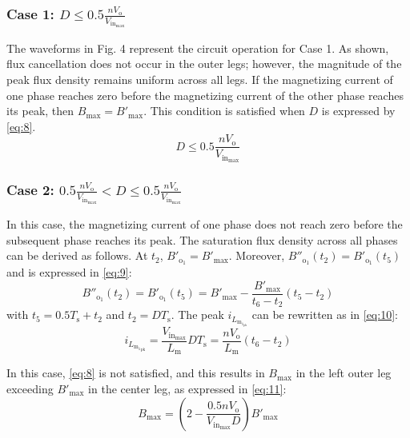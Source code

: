 \documentclass[lettersize,journal]{IEEEtran}
\begin{document}
\subsubsection*{\textup{Case 1:  $D \le 0.5 \frac{n V_{\mathrm{o}}}{V_{\mathrm{in}_{\mathrm{max}}}}$}}
The waveforms in Fig. 4 represent the circuit operation for Case 1. As shown, flux cancellation does not occur in the outer legs; however, the magnitude of the peak flux density remains uniform across all legs. If the magnetizing current of one phase reaches zero before the magnetizing current of the other phase reaches its peak, then $B_{\mathrm{max}} =  B'_{\mathrm{max}}$. This condition is satisfied when $D$ is expressed by \eqref{eq:8}.
\begin{equation}
\label{eq:8}
D \le 0.5 \frac{n V_{\mathrm{o}}}{V_{\mathrm{in}_{\mathrm{max}}}}
\end{equation}

\subsubsection*{\textup{Case 2: $0.5 \frac{n V_{\mathrm{o}}}{V_{\mathrm{in}_{\mathrm{max}}}} < D \le 0.5 \frac{n V_{\mathrm{o}}}{V_{\mathrm{in}_{\mathrm{max}}}}$}}
In this case, the magnetizing current of one phase does not reach zero before the subsequent phase reaches its peak. The saturation flux density across all phases can be derived as follows. At $t_2$, $B'_{\mathrm{o}_1} = B'_{\mathrm{max}}$. Moreover, $B''_{\mathrm{o}_1}(t_2) = B'_{\mathrm{o}_1}(t_5)$ and is expressed in \eqref{eq:9}:
\begin{equation}
\label{eq:9}
B''_{\mathrm{o}_1}(t_2) = B'_{\mathrm{o}_1}(t_5) = B'_{\mathrm{max}} - \frac{B'_{\mathrm{max}}}{t_6 - t_2}(t_5 - t_2)
\end{equation}
with $t_5 = 0.5 T_{\mathrm{s}} + t_2$ and $t_2 = D T_{\mathrm{s}}$. The peak $i_{L_{\mathrm{m}_{1_{\mathrm{pk}}}}}$ can be rewritten as in \eqref{eq:10}:
\begin{equation}
\label{eq:10}
i_{L_{{{\mathrm{m}_1}_{\mathrm{pk}}}}} = \frac{V_{\mathrm{in}_{\mathrm{max}}}}{L_{\mathrm{m}}} D T_{\mathrm{s}} = \frac{n V_{\mathrm{o}}}{L_{\mathrm{m}}}(t_6 - t_2)
\end{equation}

In this case, \eqref{eq:8} is not satisfied, and this results in $B_{\mathrm{max}}$ in the left outer leg exceeding $B'_{\mathrm{max}}$ in the center leg, as expressed in \eqref{eq:11}:
\begin{equation}
\label{eq:11}
B_{\mathrm{max}} = \left(2 - \frac{0.5 n V_{\mathrm{o}}}{V_{\mathrm{in}_{\mathrm{max}}} D}\right) B'_{\mathrm{max}}
\end{equation}
\end{document}
